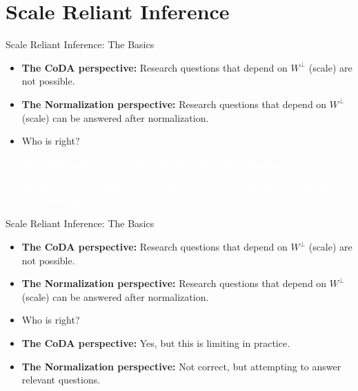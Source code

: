 \documentclass[
  ignorenonframetext,
]{beamer}
\begin{document}
\hypertarget{scale-reliant-inference}{%
\section{Scale Reliant Inference}\label{scale-reliant-inference}}

\begin{frame}{Scale Reliant Inference: The Basics}
\protect\hypertarget{scale-reliant-inference-the-basics}{}
\begin{itemize}
\item
  \textbf{The CoDA perspective:} Research questions that depend on
  \(W^\perp\) (scale) are not possible.
\item
  \textbf{The Normalization perspective:} Research questions that depend
  on \(W^\perp\) (scale) can be answered after normalization.
\item
  Who is right?
\end{itemize}

\textcolor{white}{- **The CoDA perspective:** Yes, but this is limiting in practice.}

\textcolor{white}{- **The Normalization perspective:** Not correct, but attempting to answer relevant questions.}
\end{frame}

\begin{frame}{Scale Reliant Inference: The Basics}
\protect\hypertarget{scale-reliant-inference-the-basics-1}{}
\begin{itemize}
\item
  \textbf{The CoDA perspective:} Research questions that depend on
  \(W^\perp\) (scale) are not possible.
\item
  \textbf{The Normalization perspective:} Research questions that depend
  on \(W^\perp\) (scale) can be answered after normalization.
\item
  Who is right?
\item
  \textbf{The CoDA perspective:} Yes, but this is limiting in practice.
\item
  \textbf{The Normalization perspective:} Not correct, but attempting to
  answer relevant questions.
\end{itemize}
\end{frame}
\end{document}
